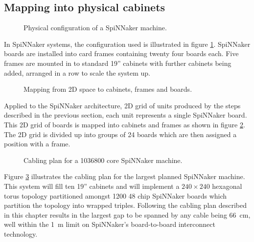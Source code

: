 		\subsection{Mapping into physical cabinets}
			
			\begin{figure}
				\center
				
				\caption{Physical configuration of a SpiNNaker machine.}
				\label{fig:cabinet-units}
			\end{figure}
			
			In SpiNNaker systems, the configuration used is illustrated in figure
			\ref{fig:cabinet-units}.  SpiNNaker boards are installed into card frames
			containing twenty four boards each. Five frames are mounted in to
			standard 19'' cabinets with further cabinets being added, arranged in a
			row to scale the system up.
			
			\begin{figure}
				\center
				
				\caption{Mapping from 2D space to cabinets, frames and boards.}
				\label{fig:cabinetisation}
			\end{figure}
			
			Applied to the SpiNNaker architecture, 2D grid of units produced by the
			steps described in the previous section, each unit represents a single
			SpiNNaker board. This 2D grid of boards is mapped into cabinets and frames
			as shown in figure \ref{fig:cabinetisation}. The 2D grid is divided up into
			groups of 24 boards which are then assigned a position with a frame.
			
			\begin{figure}
				\center
				
				\caption{Cabling plan for a \num{1036800} core SpiNNaker machine.}
				\label{fig:million-core-machine}
			\end{figure}
			
			Figure \ref{fig:million-core-machine} illustrates the cabling plan for the
			largest planned SpiNNaker machine. This system will fill ten 19'' cabinets
			and will implement a $240 \times 240$ hexagonal torus topology partitioned
			amongst \num{1200} 48 chip SpiNNaker boards which partition the topology
			into wrapped triples. Following the cabling plan described in this chapter
			results in the largest gap to be spanned by any cable being
			\SI{66}{\centi\meter}, well within the \SI{1}{\meter} limit on SpiNNaker's
			board-to-board interconnect technology.
			
